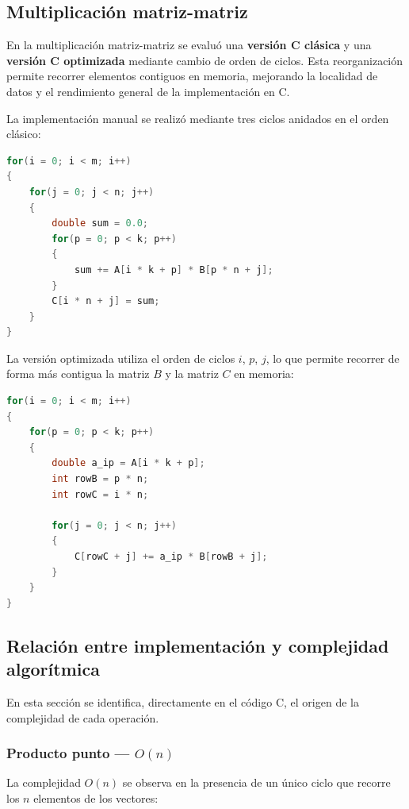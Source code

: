 \documentclass[12pt,letterpaper]{article}
\begin{document}
\subsection{Multiplicación matriz-matriz}

En la multiplicación matriz-matriz se evaluó una \textbf{versión C clásica} y una \textbf{versión C optimizada} mediante cambio de orden de ciclos. Esta reorganización permite recorrer elementos contiguos en memoria, mejorando la localidad de datos y el rendimiento general de la implementación en C.

La implementación manual se realizó mediante tres ciclos anidados en el orden clásico:

\begin{lstlisting}[language=C]
for(i = 0; i < m; i++)
{
    for(j = 0; j < n; j++)
    {
        double sum = 0.0;
        for(p = 0; p < k; p++)
        {
            sum += A[i * k + p] * B[p * n + j];
        }
        C[i * n + j] = sum;
    }
}
\end{lstlisting}

La versión optimizada utiliza el orden de ciclos $i$, $p$, $j$, lo que permite recorrer de forma más contigua la matriz $B$ y la matriz $C$ en memoria:

\begin{lstlisting}[language=C]
for(i = 0; i < m; i++)
{
    for(p = 0; p < k; p++)
    {
        double a_ip = A[i * k + p];
        int rowB = p * n;
        int rowC = i * n;

        for(j = 0; j < n; j++)
        {
            C[rowC + j] += a_ip * B[rowB + j];
        }
    }
}
\end{lstlisting}

\subsection{Relación entre implementación y complejidad algorítmica}

En esta sección se identifica, directamente en el código C, el origen de la complejidad de cada operación.

\subsubsection{Producto punto — $O(n)$}

La complejidad $O(n)$ se observa en la presencia de un único ciclo que recorre los $n$ elementos de los vectores:
\end{document}
